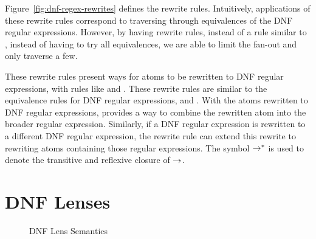 \documentclass[numbers,10pt,preprint\ifanon ,nocopyrightspace\fi]{sigplanconf}
\begin{document}
Figure~\ref{fig:dnf-regex-rewrites} defines the rewrite rules.
Intuitively, applications of these rewrite rules correspond to traversing
through equivalences of the DNF regular expressions.
However, by having rewrite rules, instead of a rule similar to
\RewriteRegexLensRule{}, instead of having to try all equivalences, we are able
to limit the fan-out and only traverse a few.

These rewrite rules present ways for atoms to be rewritten to DNF regular
expressions, with rules like \AtomUnrollstarLeftRule{} and
\AtomUnrollstarRightRule{}.
These rewrite rules are similar to the equivalence rules for DNF regular
expressions, \UnrollstarLeftRule{} and \UnrollstarRightRule{}.
With the atoms rewritten to DNF regular expressions, \DNFStructuralRewriteRule{}
provides a way to combine the rewritten atom into the broader regular
expression.
Similarly, if a DNF regular expression is rewritten to a different
DNF regular expression, the rewrite rule \AtomStructuralRewriteRule{} can extend
this rewrite to rewriting atoms containing those regular expressions.
The symbol ${\rightarrow}^*$ is used to denote the transitive and reflexive
closure of $\rightarrow$.

\section{DNF Lenses}

\begin{figure}
  \caption{DNF Lens Semantics}
  \label{fig:dnf-lens-semantics}
\end{figure}
\end{document}
